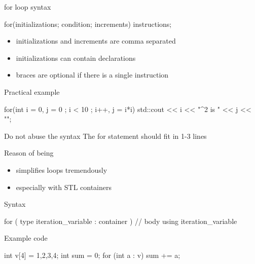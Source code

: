 \begin{frame}[fragile]
  \begin{block}{for loop syntax}
    \begin{cppcode*}{}
      for(initializations; condition; increments) {
        instructions;
      }
    \end{cppcode*}
    \vspace{-0.2cm}
    \begin{itemize}
      \item initializations and increments are comma separated
      \item initializations can contain declarations
      \item braces are optional if there is a single instruction
    \end{itemize}
  \end{block}
  \pause
  \begin{exampleblock}{Practical example}
    \begin{cppcode*}{}
      for(int i = 0, j = 0 ; i < 10 ; i++, j = i*i) {
        std::cout << i << "^2 is " << j << "\n";
      }
    \end{cppcode*}
  \end{exampleblock}
  \pause
  \begin{alertblock}{Do not abuse the syntax}
    The for statement should fit in 1-3 lines
  \end{alertblock}
\end{frame}

\begin{frame}[fragile]
  \begin{block}{Reason of being}
    \begin{itemize}
    \item simplifies loops tremendously
    \item especially with STL containers
    \end{itemize}
  \end{block}
  \begin{block}{Syntax}
    \begin{cppcode*}{}
      for ( type iteration_variable : container ) {
        // body using iteration_variable
      }
    \end{cppcode*}
  \end{block}
  \begin{exampleblock}{Example code}
    \begin{cppcode*}{}
      int v[4] = {1,2,3,4};
      int sum = 0;
      for (int a : v) { sum += a; }
    \end{cppcode*}
  \end{exampleblock}
\end{frame}

